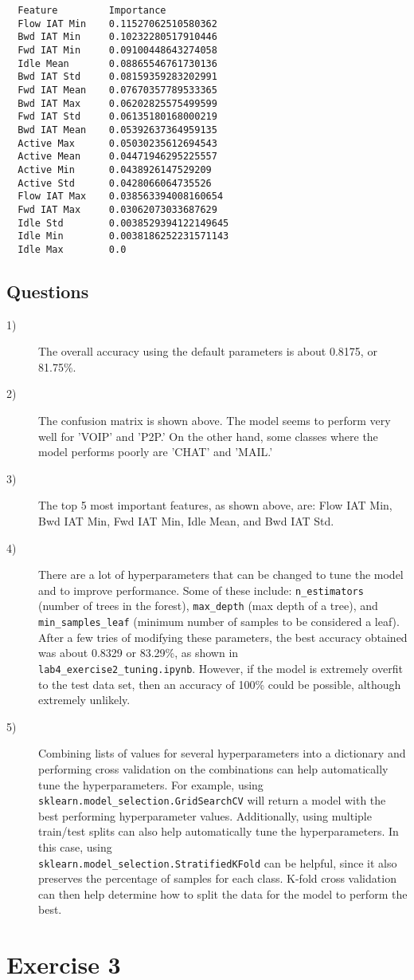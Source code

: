 \documentclass[11pt]{article}
\begin{document}
\begin{verbatim}
  Feature         Importance
  Flow IAT Min    0.11527062510580362
  Bwd IAT Min     0.10232280517910446
  Fwd IAT Min     0.09100448643274058
  Idle Mean       0.08865546761730136
  Bwd IAT Std     0.08159359283202991
  Fwd IAT Mean    0.07670357789533365
  Bwd IAT Max     0.06202825575499599
  Fwd IAT Std     0.06135180168000219
  Bwd IAT Mean    0.05392637364959135
  Active Max      0.05030235612694543
  Active Mean     0.04471946295225557
  Active Min      0.0438926147529209
  Active Std      0.0428066064735526
  Flow IAT Max    0.038563394008160654
  Fwd IAT Max     0.03062073033687629
  Idle Std        0.0038529394122149645
  Idle Min        0.0038186252231571143
  Idle Max        0.0
\end{verbatim}
\subsection*{Questions}
\begin{description}
  \item[1)] The overall accuracy using the default parameters is about 0.8175, or 81.75\%.
  \item[2)] The confusion matrix is shown above. The model seems to perform very well for 'VOIP' and 'P2P.' On the other hand, some classes where the
    model performs poorly are 'CHAT' and 'MAIL.'
  \item[3)] The top 5 most important features, as shown above, are: Flow IAT Min, Bwd IAT Min, Fwd IAT Min, Idle Mean, and Bwd IAT Std.
  \item[4)] There are a lot of hyperparameters that can be changed to tune the model and to improve performance. Some of these include: \verb|n_estimators| (number of trees
    in the forest), \verb|max_depth| (max depth of a tree), and \verb|min_samples_leaf| (minimum number of samples to be considered a leaf). After a few tries of modifying these
    parameters, the best accuracy obtained was about 0.8329 or 83.29\%, as shown in \\\verb|lab4_exercise2_tuning.ipynb|. However, if the model is extremely overfit to
    the test data set, then an accuracy of 100\% could be possible, although extremely unlikely.
  \item[5)] Combining lists of values for several hyperparameters into a dictionary and performing cross validation on the combinations can help automatically tune
    the hyperparameters. For example, using \\\verb|sklearn.model_selection.GridSearchCV| will return a model with the best performing hyperparameter values. Additionally,
    using multiple train/test splits can also help automatically tune the hyperparameters. In this case, using \\\verb|sklearn.model_selection.StratifiedKFold| can be
    helpful, since it also preserves the percentage of samples for each class. K-fold cross validation can then help determine how to split the data for the model to
    perform the best.
\end{description}
\section*{Exercise 3}


\end{document}
